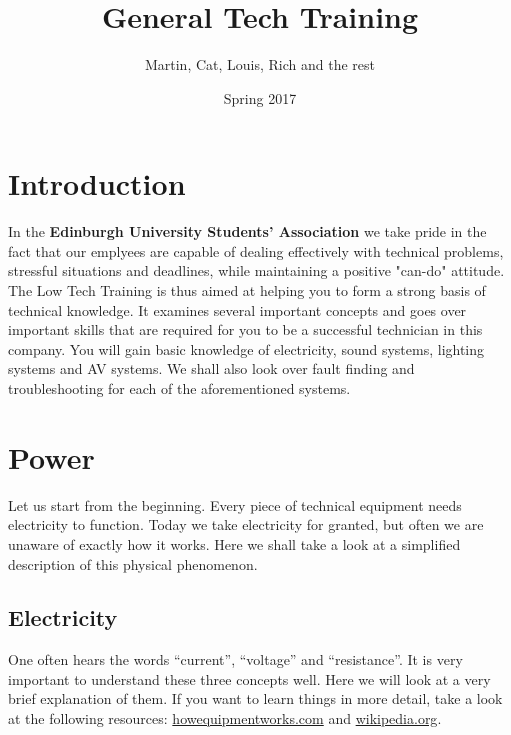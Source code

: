 \documentclass[14pt,twocolumn]{extarticle} %
\title{\huge {\textbf{General Tech Training}}} %
\author{Martin, Cat, Louis, Rich and the rest}
\date{Spring 2017}
\begin{document}

\section{Introduction}
\label{intro}
In the \textbf{Edinburgh University Students' Association} we take pride in the fact that our emplyees are capable of dealing effectively with technical problems, stressful situations and deadlines, while maintaining a positive "can-do" attitude.
The Low Tech Training is thus aimed at helping you to form a strong basis of technical knowledge. It examines several important concepts and goes over important skills that are required for you to be a successful technician in this company. You will gain basic knowledge of electricity, sound systems, lighting systems and AV systems. We shall also look over fault finding and troubleshooting for each of the aforementioned systems.


\section{Power}
\label{power}

Let us start from the beginning. Every piece of technical equipment needs electricity to function. Today we take electricity for granted, but often we are unaware of exactly how it works. Here we shall take a look at a simplified description of this physical phenomenon. 

\subsection{Electricity}
\label{electricity}
One often hears the words “current”, “voltage” and “resistance”. It is very important to understand these three concepts well. Here we will look at a very brief explanation of them. If you want to learn things in more detail, take a look at the following resources: \href{https://www.howequipmentworks.com/electricity_basics/}{howequipmentworks.com} and \href{https://en.wikipedia.org/wiki/Electricity#Electric_charge}{wikipedia.org}.
\end{document}

